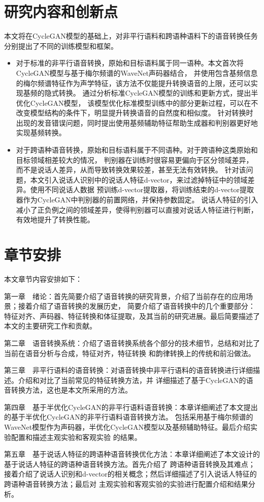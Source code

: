 \section{研究内容和创新点}
本文将在CycleGAN模型的基础上，对非平行语料和跨语种语料下的语音转换任务分别提出了不同的训练模型和框架。

\begin{itemize}
    \item 对于标准的非平行语音转换，原始和目标语料属于同一语种。本文首次将CycleGAN模型与基于梅尔频谱的WaveNet声码器结合，
    并使用包含基频信息的梅尔频谱特征作为声学特征，该方法不仅能提升转换语音的上限，还可以实现基频的隐式转换。
    通过分析标准CycleGAN模型的训练和更新方式，提出半优化CycleGAN模型，
    该模型优化标准模型训练中的部分更新过程，可以在不改变模型结构的条件下，明显提升转换语音的自然度和相似度。
    针对转换时出现的发音错误问题，同时提出使用基频辅助特征帮助生成器和判别器更好地实现基频转换。
    \item 对于跨语种语音转换，原始和目标语料属于不同语种。对于跨语种这类原始和目标领域相差较大的情况，
    判别器在训练时很容易更偏向于区分领域差异，而不是说话人差异，从而导致转换效果较差，甚至无法有效转换。
    针对该问题，本文引入说话人识别中的说话人特征d-vector，来过滤掉特征中的领域差异。使用不同说话人数据
    预训练d-vector提取器，将训练结束的d-vector提取器作为CycleGAN中判别器的前置网络，并保持参数固定。
    说话人特征的引入减小了正负例之间的领域差异，使得判别器可以直接对说话人特征进行判断，有效地提升了转换性能。
\end{itemize}


\section{章节安排}
本文章节内容安排如下：

第一章　绪论：首先简要介绍了语音转换的研究背景，介绍了当前存在的应用场景；接着介绍了语音转换的发展历史，
简要介绍了语音转换中的几个重要部分：特征对齐、声码器、特征转换和体征提取，及其当前的研究进展。最后简要描述了
本文的主要研究工作和贡献。

第二章　语音转换系统：介绍了语音转换系统各个部分的技术细节，总结和对比了当前在语音分析与合成，特征对齐，特征转换
和韵律转换上的传统和前沿做法。

第三章　非平行语料的语音转换：对语音转换中非平行语料的语音转换进行详细描述。介绍和对比了当前常见的特征转换方法，并
详细描述了基于CycleGAN的语音转换方法，这也是本文所采用的方法。

第四章　基于半优化CycleGAN的非平行语料语音转换：本章详细阐述了本文提出的基于半优化CycleGAN的非平行语料语音转换方法。
包括采用基于梅尔频谱的WaveNet模型作为声码器，半优化CycleGAN模型以及基频辅助特征。最后介绍实验配置和描述主观实验和客观实验
的结果。

第五章　基于说话人特征的跨语种语音转换优化方法：本章详细阐述了本文设计的基于说话人特征的跨语种语音转换方法。首先介绍了
跨语种语音转换及其难点；接着介绍了说话人识别和d-vector的相关概念；然后详细描述了引入说话人特征的跨语种语音转换方法；最后对
主观实验和客观实验的实验进行配置介绍和结果分析。


